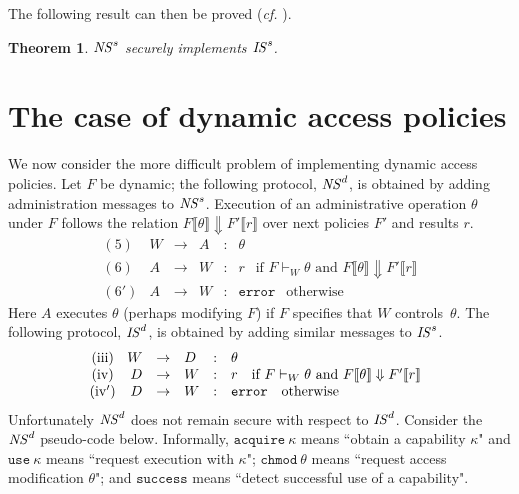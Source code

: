 \documentclass[10pt]{article}
\newtheorem{theorem}{Theorem}
\begin{document}
The following result can then be proved (\emph{cf.} \cite{ChaudhuriAbadi-FMSE05}).
\begin{theorem}\label{thm:static}
${\it NS}^s$ securely implements ${\it IS}^s$.
\end{theorem}



\section{The case of dynamic access policies}\label{intro-dyn}
\noindent
We now consider the more difficult problem of implementing dynamic access  policies. 
Let $F$ be dynamic; the following protocol, ${\it NS}^d$, is obtained by adding administration messages to ${\it NS}^s$. Execution of an administrative operation $\theta$ under $F$ follows the relation $F\llbracket\theta\rrbracket \Downarrow F'\llbracket r\rrbracket$ over next policies $F'$ and results $r$. 
\[
\left.
\begin{array}{crclcl}
\!\!\!\! (5)\! & W & \rightarrow  & A & : & \theta \\
\!\!\!\! (6)\! & A & \rightarrow  & W & : & r~~\mbox{ if }F \vdash_W \theta\mbox{ and }F\llbracket\theta\rrbracket \Downarrow F'\llbracket r\rrbracket \\
\!\!\!\! (6')\! & A & \rightarrow  & W & : & \mathtt{error}~~\mbox{ otherwise }
\end{array}
\right.
\]
Here $A$ executes $\theta$ (perhaps modifying $F$) if $F$ specifies that $W$ controls~$\theta$. 
The following protocol, ${\it IS}^d$, is obtained by adding similar messages to ${\it IS}^s$.
\[
\left.
\begin{array}{crclcll}
 \!\!\!\!({\rm iii})\! & W & \rightarrow  & D & : & \theta \\
 \!\!\!\!({\rm iv})\! & D & \rightarrow  & W & : & r~~\mbox{ if }F \vdash_W \theta\mbox{ and }F\llbracket\theta\rrbracket \Downarrow F'\llbracket r\rrbracket \\
\!\!\!\! ({\rm iv'})\! & D & \rightarrow  & W & : & \mathtt{error}~~\mbox{ otherwise } 
\end{array}
\right.
\]
Unfortunately ${\it NS}^d$ does not remain secure with respect to ${\it IS}^d$.
Consider the ${\it NS}^d$ pseudo-code below. Informally, $\mathtt{acquire}~\kappa$ means ``obtain a capability $\kappa$" and $\mathtt{use}~\kappa$ means ``request execution with $\kappa$"; $\mathtt{chmod}~\theta$ means ``request access modification $\theta$"; and $\mathtt{success}$ means ``detect successful use of a capability". 
\end{document}
